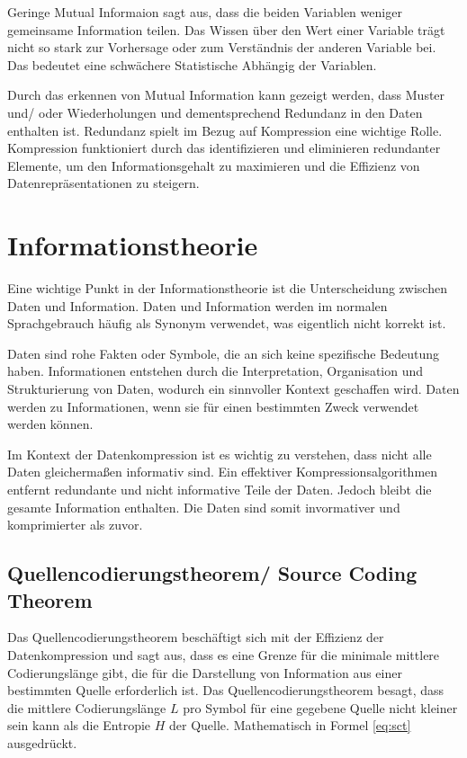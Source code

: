 \documentclass[conference]{IEEEtran}
\begin{document}
Geringe Mutual Informaion sagt aus, dass die beiden Variablen weniger gemeinsame
Information teilen.
Das Wissen über den Wert einer Variable trägt nicht so stark zur
Vorhersage oder zum Verständnis der anderen Variable bei.
Das bedeutet eine schwächere Statistische Abhängig der Variablen.

Durch das erkennen von Mutual Information kann gezeigt werden, dass Muster und/ oder
Wiederholungen und dementsprechend Redundanz in den Daten enthalten ist.
Redundanz spielt im Bezug auf Kompression eine wichtige Rolle.
Kompression funktioniert durch das identifizieren und eliminieren redundanter Elemente,
um den Informationsgehalt zu maximieren und die Effizienz von Datenrepräsentationen
zu steigern.


\section{Informationstheorie}

Eine wichtige Punkt in der Informationstheorie ist die Unterscheidung 
zwischen Daten und Information.
Daten und Information werden im normalen Sprachgebrauch häufig als Synonym verwendet,
was eigentlich nicht korrekt ist.

Daten sind rohe Fakten oder Symbole, die an sich keine spezifische Bedeutung haben.
Informationen entstehen durch die Interpretation, Organisation und Strukturierung
von Daten, wodurch ein sinnvoller Kontext geschaffen wird. \cite{pieper}
Daten werden zu Informationen, wenn sie für einen bestimmten Zweck verwendet werden können.

Im Kontext der Datenkompression ist es wichtig zu verstehen, dass nicht alle Daten
gleichermaßen informativ sind. 
Ein effektiver Kompressionsalgorithmen entfernt redundante
und nicht informative Teile der Daten.
Jedoch bleibt die gesamte Information enthalten. 
Die Daten sind somit invormativer und komprimierter als zuvor.

\subsection{Quellencodierungstheorem/ Source Coding Theorem}

Das Quellencodierungstheorem beschäftigt sich mit der Effizienz der Datenkompression
und sagt aus, dass es eine Grenze für die minimale mittlere Codierungslänge gibt, 
die für die Darstellung von Information aus einer bestimmten Quelle erforderlich 
ist. \cite{sharma} 
Das Quellencodierungstheorem besagt, dass die mittlere Codierungslänge $L$ pro Symbol 
für eine gegebene Quelle nicht kleiner sein kann als die Entropie $H$ der Quelle. 
Mathematisch in Formel \ref{eq:sct} ausgedrückt.
\end{document}
